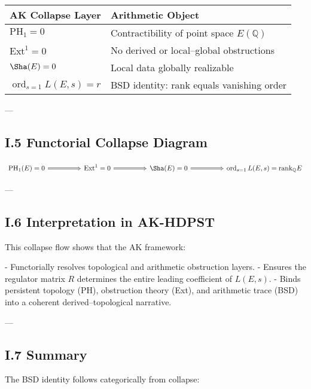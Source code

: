\begin{center}
\begin{tabular}{ll}
\toprule
\textbf{AK Collapse Layer} & \textbf{Arithmetic Object} \\
\midrule
\( \mathrm{PH}_1 = 0 \)         & Contractibility of point space \( E(\mathbb{Q}) \) \\
\( \mathrm{Ext}^1 = 0 \)        & No derived or local–global obstructions \\
\( \Sha(E) = 0 \)              & Local data globally realizable \\
\( \operatorname{ord}_{s=1} L(E,s) = r \) & BSD identity: rank equals vanishing order \\
\bottomrule
\end{tabular}
\end{center}

---

\subsection*{I.5 Functorial Collapse Diagram}

\[
\begin{tikzcd}[row sep=large, column sep=huge]
\mathrm{PH}_1(E) = 0 \arrow[r, Rightarrow] & 
\mathrm{Ext}^1 = 0 \arrow[r, Rightarrow] & 
\Sha(E) = 0 \arrow[r, Rightarrow] & 
\operatorname{ord}_{s=1} L(E,s) = \mathrm{rank}_\mathbb{Q} E
\end{tikzcd}
\]

---

\subsection*{I.6 Interpretation in AK-HDPST}

This collapse flow shows that the AK framework:

- Functorially resolves topological and arithmetic obstruction layers.
- Ensures the regulator matrix \( R \) determines the entire leading coefficient of \( L(E,s) \).
- Binds persistent topology (PH), obstruction theory (Ext), and arithmetic trace (BSD) into a coherent derived–topological narrative.

---

\subsection*{I.7 Summary}

The BSD identity follows categorically from collapse:

